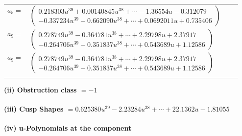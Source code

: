\documentclass[1p]{elsarticle_modified}
\theoremstyle{definition}
\begin{document}
\begin{tabular}{m{7pt} m{180pt} m{7pt} m{180pt} }
\flushright $a_{5}=$&$\begin{pmatrix}0.218303 u^{39}+0.00140845 u^{38}+\cdots-1.36554 u-0.312079\\-0.337234 u^{39}-0.662090 u^{38}+\cdots+0.0692011 u+0.735406\end{pmatrix}$ \\
\flushright $a_{9}=$&$\begin{pmatrix}0.278749 u^{39}-0.364781 u^{38}+\cdots+2.29798 u+2.37917\\-0.264706 u^{39}-0.351837 u^{38}+\cdots+0.543689 u+1.12586\end{pmatrix}$\\ \flushright $a_{9}=$&$\begin{pmatrix}0.278749 u^{39}-0.364781 u^{38}+\cdots+2.29798 u+2.37917\\-0.264706 u^{39}-0.351837 u^{38}+\cdots+0.543689 u+1.12586\end{pmatrix}$\\&\end{tabular}
\flushleft \textbf{(ii) Obstruction class $= -1$}\\~\\
\flushleft \textbf{(iii) Cusp Shapes $= 0.625380 u^{39}-2.23284 u^{38}+\cdots+22.1362 u-1.81055$}\\~\\
\newpage\renewcommand{\arraystretch}{1}
\flushleft \textbf{(iv) u-Polynomials at the component}\newline \\
\end{document}
